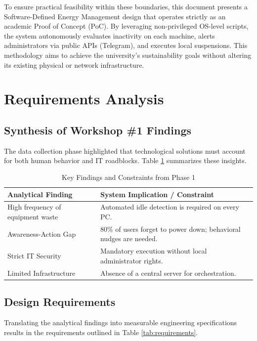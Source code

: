 \documentclass[conference]{IEEEtran}
\begin{document}
To ensure practical feasibility within these boundaries, this document presents a Software-Defined Energy Management design that operates strictly as an academic Proof of Concept (PoC). By leveraging non-privileged OS-level scripts, the system autonomously evaluates inactivity on each machine, alerts administrators via public APIs (Telegram), and executes local suspensions. This methodology aims to achieve the university's sustainability goals without altering its existing physical or network infrastructure.

\section{Requirements Analysis}

\subsection{Synthesis of Workshop \#1 Findings}
The data collection phase highlighted that technological solutions must account for both human behavior and IT roadblocks. Table \ref{tab:findings} summarizes these insights.

\begin{table}[htbp]
\caption{Key Findings and Constraints from Phase 1}
\label{tab:findings}
\centering
\begin{tabular}{|p{3cm}|p{4.5cm}|}
\hline
\textbf{Analytical Finding} & \textbf{System Implication / Constraint} \\
\hline
High frequency of equipment waste & Automated idle detection is required on every PC. \\
\hline
Awareness-Action Gap & 80\% of users forget to power down; behavioral nudges are needed. \\
\hline
Strict IT Security & Mandatory execution without local administrator rights. \\
\hline
Limited Infrastructure & Absence of a central server for orchestration. \\
\hline
\end{tabular}
\end{table}

\subsection{Design Requirements}
Translating the analytical findings into measurable engineering specifications results in the requirements outlined in Table \ref{tab:requirements}.
\end{document}
